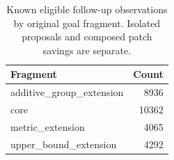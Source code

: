 \begin{table}[!htbp]\centering\small
\caption{Known eligible follow-up observations by original goal fragment. Isolated proposals and composed patch savings are separate.}
\begin{tabular}{lr}\toprule
Fragment & Count\\\midrule
additive\_group\_extension & 8936\\
core & 10362\\
metric\_extension & 4065\\
upper\_bound\_extension & 4292\\
\bottomrule\end{tabular}\end{table}
